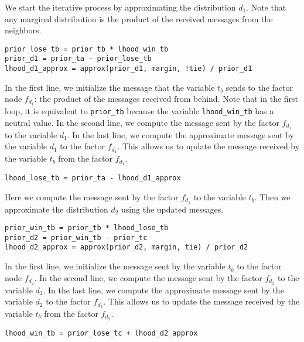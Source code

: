 \documentclass[article]{jss}
\begin{document}
We start the iterative process by approximating the distribution $d_1$. 
Note that any marginal distribution is the product of the received messages from the neighbors. 
%
\begin{lstlisting}[captionpos=b,backgroundcolor=\color{all}, label=lst:d1, caption={Approximating the distribution $d_1$ with the last message sent by $t_b$.},belowskip=0cm]
prior_lose_tb = prior_tb * lhood_win_tb
prior_d1 = prior_ta - prior_lose_tb
lhood_d1_approx = approx(prior_d1, margin, !tie) / prior_d1 
\end{lstlisting}
%
In the first line, we initialize the message that the variable $t_b$ sends to the factor node $f_{d_1}$: the product of the messages received from behind. 
Note that in the first loop, it is equivalent to \texttt{prior\_tb} because the variable \texttt{lhood\_win\_tb} has a neutral value. 
In the second line, we compute the message sent by the factor $f_{d_1}$ to the variable $d_1$. 
In the last line, we compute the approximate message sent by the variable $d_1$ to the factor $f_{d_1}$. 
This allows us to update the message received by the variable $t_b$ from the factor $f_{d_1}$. 
%
\begin{lstlisting}[captionpos=b,backgroundcolor=\color{all},label=lst:tb_lose, caption={Updating the messages of $t_b$  with the last approximation of $d_1$.},belowskip=0cm]
lhood_lose_tb = prior_ta - lhood_d1_approx 
\end{lstlisting}
%
Here we compute the message sent by the factor $f_{d_1}$ to the variable $t_b$. 
Then we approximate the distribution $d_2$ using the updated messages. 
%
\begin{lstlisting}[captionpos=b,backgroundcolor=\color{all},label=lst:d2, caption={Approximating de distribution $d_2$ with the last messages sent by $t_b$.},belowskip=0cm]
prior_win_tb = prior_tb * lhood_lose_tb
prior_d2 = prior_win_tb - prior_tc
lhood_d2_approx = approx(prior_d2, margin, tie) / prior_d2 
\end{lstlisting}
%
In the first line, we initialize the message sent by the variable $t_b$ to the factor node $f_{d_2}$. 
In the second line, we compute the message sent by the factor $f_{d_2}$ to the variable $d_2$. 
In the last line, we compute the approximate message sent by the variable $d_2$ to the factor $f_{d_2}$. 
This allows us to update the message received by the variable $t_b$ from the factor $f_{d_2}$. 
%
\begin{lstlisting}[captionpos=b,backgroundcolor=\color{all},label=lst:tb_win, caption={Updating the $t_b$ distribution with the last approximation of $d_2$.},belowskip=0cm]
lhood_win_tb = prior_lose_tc + lhood_d2_approx
\end{lstlisting}
\end{document}
